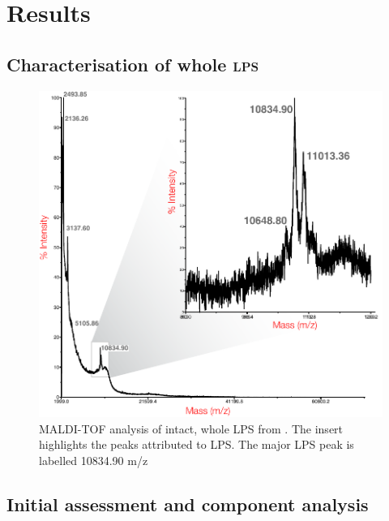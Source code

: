 \section{Results} %
\label{sec:results}
	\subsection{Characterisation of whole \textsc{lps}} %
	\label{sub:characterisation_of_whole_lps}
		
		\begin{figure}[htb]
			\begin{center}
				\includegraphics[]{lps_chapter/img/malditof.pdf}
			\end{center}
			\caption[\Ac{MALDI-TOF} analysis of intact, whole \ac{LPS} from \caulobacter.]{\ac{MALDI-TOF} analysis of intact, whole \ac{LPS} from \caulobacter. The insert highlights the peaks attributed to \ac{LPS}. The major \ac{LPS} peak is labelled 10834.90 m/z}
			\label{fig:lpsmalditof}
		\end{figure}

	\subsection{Initial assessment and component analysis} %
	\label{sub:initial_assessment_and_component_analysis}

